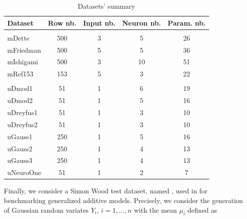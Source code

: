 \begin{Schunk}
\begin{table}

\caption{\label{tab:NNdatasets}Datasets' summary}
\centering
\fontsize{7}{9}\selectfont
\begin{tabular}[t]{lcccc}
\toprule
Dataset & Row nb. & Input nb. & Neuron nb. & Param. nb.\\
\midrule
\addlinespace[0.3em]
\multicolumn{5}{l}{\textbf{Multivariate}}\\
\hspace{1em}mDette & 500 & 3 & 5 & 26\\
\hspace{1em}mFriedman & 500 & 5 & 5 & 36\\
\hspace{1em}mIshigami & 500 & 3 & 10 & 51\\
\hspace{1em}mRef153 & 153 & 5 & 3 & 22\\
\addlinespace[0.3em]
\multicolumn{5}{l}{\textbf{Univariate}}\\
\hspace{1em}uDmod1 & 51 & 1 & 6 & 19\\
\hspace{1em}uDmod2 & 51 & 1 & 5 & 16\\
\hspace{1em}uDreyfus1 & 51 & 1 & 3 & 10\\
\hspace{1em}uDreyfus2 & 51 & 1 & 3 & 10\\
\hspace{1em}uGauss1 & 250 & 1 & 5 & 16\\
\hspace{1em}uGauss2 & 250 & 1 & 4 & 13\\
\hspace{1em}uGauss3 & 250 & 1 & 4 & 13\\
\hspace{1em}uNeuroOne & 51 & 1 & 2 & 7\\
\bottomrule
\end{tabular}
\end{table}

\end{Schunk}

Finally, we consider a Simon Wood test dataset, named ,
used in \citep{wood2011fast} for benchmarking generalized additive
models. Precisely, we consider the generation of Gaussian random
variates \(Y_i\), \(i=1,\dots,n\) with the mean \(\mu_i\) defined as

